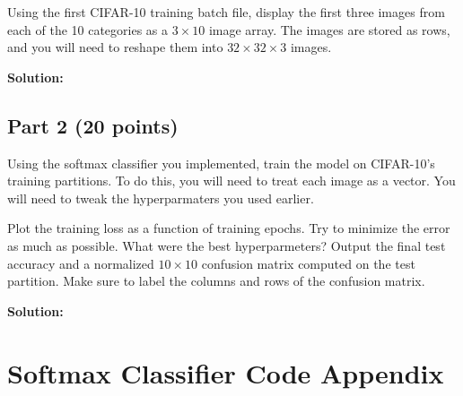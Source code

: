 \documentclass[11pt, oneside]{article}   	%
\begin{document}
Using the first CIFAR-10 training batch file, display the first three images from each of the 10 categories as a $3 \times 10$ image array. The images are stored as rows, and you will need to reshape them into $32 \times 32 \times 3$ images. 

\textbf{Solution:}\\

\subsection*{Part 2 (20 points)}
Using the softmax classifier you implemented, train the model on CIFAR-10's training partitions. To do this, you will need to treat each image as a vector. You will need to tweak the hyperparmaters you used earlier. 

Plot the training loss as a function of training epochs. Try to minimize the error as much as possible. What were the best hyperparmeters? Output the final test accuracy and a normalized $10 \times 10$ confusion matrix computed on the test partition. Make sure to label the columns and rows of the confusion matrix.

\textbf{Solution:}\\


\section*{Softmax Classifier Code Appendix}
\end{document}
